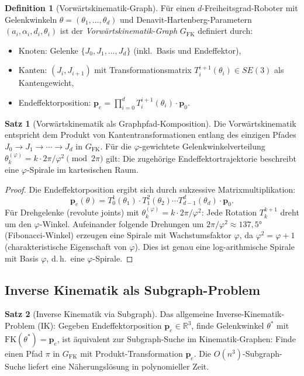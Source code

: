 ﻿\documentclass[a4paper,12pt]{article}
\theoremstyle{definition}
\newtheorem{definition}{Definition}
\newtheorem{satz}{Satz}
\begin{document}
\begin{definition}[Vorw\"artskinematik-Graph]
F\"ur einen $d$-Freiheitsgrad-Roboter mit Gelenkwinkeln
$\theta = (\theta_1, \ldots, \theta_d)$ und
Denavit-Hartenberg-Parametern $(a_i, \alpha_i, d_i, \theta_i)$
ist der \emph{Vorw\"artskinematik-Graph} $G_{\mathrm{FK}}$
definiert durch:
\begin{itemize}
    \item Knoten: Gelenke $\{J_0, J_1, \ldots, J_d\}$ (inkl.\ Basis und Endeffektor),
    \item Kanten: $(J_i, J_{i+1})$ mit Transformationsmatrix
          $T_i^{i+1}(\theta_i) \in SE(3)$ als Kantengewicht,
    \item Endeffektorposition: $\mathbf{p}_e = \prod_{i=0}^d T_i^{i+1}(\theta_i) \cdot \mathbf{p}_0$.
\end{itemize}
\end{definition}

\begin{satz}[Vorw\"artskinematik als Graphpfad-Komposition]
\label{satz:fk_graph}
Die Vorw\"artskinematik entspricht dem Produkt von Kantentransformationen
entlang des einzigen Pfades $J_0 \to J_1 \to \cdots \to J_d$ in $G_{\mathrm{FK}}$.
F\"ur die $\varphi$-gewichtete Gelenkwinkelverteilung
$\theta_k^{(\varphi)} = k \cdot 2\pi/\varphi^2 \pmod{2\pi}$ gilt:
Die zugeh\"orige Endeffektortrajektorie beschreibt eine $\varphi$-Spirale
im kartesischen Raum.
\end{satz}

\begin{proof}
Die Endeffektorposition ergibt sich durch sukzessive Matrixmultiplikation:
\[
\mathbf{p}_e(\theta) = T_0^1(\theta_1) \cdot T_1^2(\theta_2) \cdots T_{d-1}^d(\theta_d) \cdot \mathbf{p}_0.
\]
F\"ur Drehgelenke (revolute joints) mit $\theta_k^{(\varphi)} = k \cdot 2\pi/\varphi^2$:
Jede Rotation $T_k^{k+1}$ dreht um den $\varphi$-Winkel.
Aufeinander folgende Drehungen um $2\pi/\varphi^2 \approx 137{,}5 °$
(Fibonacci-Winkel) erzeugen eine Spirale mit Wachstumsfaktor $\varphi$,
da $\varphi^2 = \varphi + 1$ (charakteristische Eigenschaft von $\varphi$).
Dies ist genau eine log-arithmische Spirale mit Basis $\varphi$,
d.\,h.\ eine $\varphi$-Spirale.
\end{proof}

\subsection{Inverse Kinematik als Subgraph-Problem}

\begin{satz}[Inverse Kinematik via Subgraph]
\label{satz:ik_subgraph}
Das allgemeine Inverse-Kinematik-Problem (IK): Gegeben Endeffektorposition
$\mathbf{p}_e \in \mathbb{R}^3$, finde Gelenkwinkel $\theta^*$ mit
$\mathrm{FK}(\theta^*) = \mathbf{p}_e$, ist \"aquivalent zur
Subgraph-Suche im Kinematik-Graphen: Finde einen Pfad $\pi$ in $G_{\mathrm{FK}}$
mit Produkt-Transformation $\mathbf{p}_e$.
Die $O(n^3)$-Subgraph-Suche liefert eine N\"aherungsl\"osung in polynomieller Zeit.
\end{satz}
\end{document}
